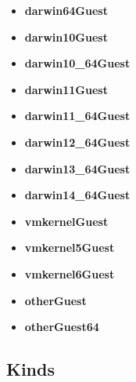 \begin{itemize}
\item \textbf{darwin64Guest} 
\end{itemize}
\begin{itemize}
\item \textbf{darwin10Guest} 
\end{itemize}
\begin{itemize}
\item \textbf{darwin10\_64Guest} 
\end{itemize}
\begin{itemize}
\item \textbf{darwin11Guest} 
\end{itemize}
\begin{itemize}
\item \textbf{darwin11\_64Guest} 
\end{itemize}
\begin{itemize}
\item \textbf{darwin12\_64Guest} 
\end{itemize}
\begin{itemize}
\item \textbf{darwin13\_64Guest} 
\end{itemize}
\begin{itemize}
\item \textbf{darwin14\_64Guest} 
\end{itemize}
\begin{itemize}
\item \textbf{vmkernelGuest} 
\end{itemize}
\begin{itemize}
\item \textbf{vmkernel5Guest} 
\end{itemize}
\begin{itemize}
\item \textbf{vmkernel6Guest} 
\end{itemize}
\begin{itemize}
\item \textbf{otherGuest} 
\end{itemize}
\begin{itemize}
\item \textbf{otherGuest64} 
\end{itemize}

\subsection{Kinds}
